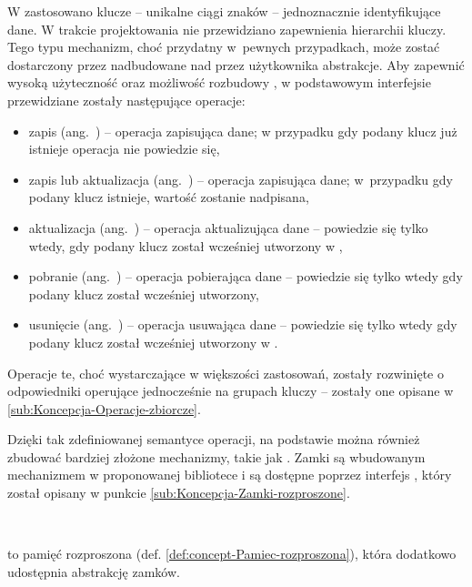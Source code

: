 W  zastosowano klucze -- unikalne
ciągi znaków -- jednoznacznie identyfikujące dane. W trakcie projektowania
 nie przewidziano zapewnienia hierarchii
kluczy. Tego typu mechanizm, choć przydatny w~pewnych przypadkach,
może zostać dostarczony przez nadbudowane nad 
przez użytkownika abstrakcje. Aby zapewnić wysoką użyteczność oraz
możliwość rozbudowy , w podstawowym
interfejsie przewidziane zostały następujące operacje:
\begin{itemize}
\item zapis (ang.~) -- operacja zapisująca dane; w przypadku
gdy podany klucz już istnieje operacja nie powiedzie się,
\item zapis lub aktualizacja (ang.~) -- operacja
zapisująca dane; w~przypadku gdy podany klucz istnieje, wartość zostanie
nadpisana,
\item aktualizacja (ang.~) -- operacja aktualizująca dane
-- powiedzie się tylko wtedy, gdy podany klucz został wcześniej utworzony
w ,
\item pobranie (ang.~) -- operacja pobierająca dane
-- powiedzie się tylko wtedy gdy podany klucz został wcześniej utworzony,
\item usunięcie (ang.~) -- operacja usuwająca dane --
powiedzie się tylko wtedy gdy podany klucz został wcześniej utworzony
w .
\end{itemize}
Operacje te, choć wystarczające w większości zastosowań, zostały rozwinięte
o odpowiedniki operujące jednocześnie na grupach kluczy -- zostały
one opisane w \ref{sub:Koncepcja-Operacje-zbiorcze}.

Dzięki tak zdefiniowanej semantyce operacji, na podstawie 
można również zbudować bardziej złożone mechanizmy, takie jak .
Zamki są wbudowanym mechanizmem w proponowanej bibliotece i są dostępne
poprzez interfejs , który
został opisany w punkcie \ref{sub:Koncepcja-Zamki-rozproszone}.
\begin{defn}
~

\noindent {}to pamięć
rozproszona (def. \ref{def:concept-Pamiec-rozproszona}), która dodatkowo
udostępnia abstrakcję zamków.
\end{defn}

